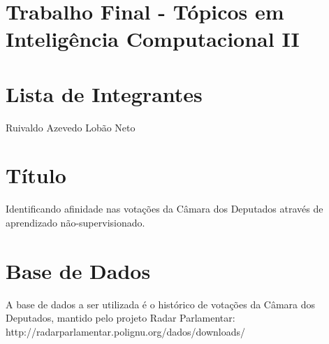 \documentclass{article}
\begin{document}
\section*{Trabalho Final - Tópicos em Inteligência Computacional II}

\section{Lista de Integrantes}

Ruivaldo Azevedo Lobão Neto

\section{Título}

Identificando afinidade nas votações da Câmara dos Deputados através de aprendizado não-supervisionado.

\section{Base de Dados}

A base de dados a ser utilizada é o histórico de votações da Câmara dos Deputados, mantido pelo projeto Radar Parlamentar: http://radarparlamentar.polignu.org/dados/downloads/
\end{document}
